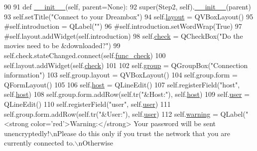 \begin{DoxyCode}
90 
91     \textcolor{keyword}{def }\hyperlink{classmovies2hdd_1_1gui_1_1_step2_adbcd30dbde1136bd162a892ee16f6584}{\_\_init\_\_}(self, parent=None):
92         super(Step2, self).\hyperlink{classmovies2hdd_1_1gui_1_1_step2_adbcd30dbde1136bd162a892ee16f6584}{\_\_init\_\_}(parent)
93         self.setTitle(\textcolor{stringliteral}{"Connect to your Dreambox"})
94         self.\hyperlink{classmovies2hdd_1_1gui_1_1_step2_a0a18ea7d6f2a66251b60d74b8af0696b}{layout} = QVBoxLayout()
95         \textcolor{comment}{#self.introduction = QLabel("")}
96         \textcolor{comment}{#self.introduction.setWordWrap(True)}
97         \textcolor{comment}{#self.layout.addWidget(self.introduction)}
98         self.\hyperlink{classmovies2hdd_1_1gui_1_1_step2_af460b9a80cc6f30892480537debd47f9}{check} = QCheckBox(\textcolor{stringliteral}{"Do the movies need to be &downloaded?"})
99         self.check.stateChanged.connect(self.\hyperlink{classmovies2hdd_1_1gui_1_1_step2_a9edb6b6d3a228791366c2003c7b17edf}{func\_check})
100         self.layout.addWidget(self.\hyperlink{classmovies2hdd_1_1gui_1_1_step2_af460b9a80cc6f30892480537debd47f9}{check})
101 
102         self.\hyperlink{classmovies2hdd_1_1gui_1_1_step2_ac4656ee08d1176420516f83a856b0799}{group} = QGroupBox(\textcolor{stringliteral}{"Connection information"})
103         self.group.layout = QVBoxLayout()
104         self.group.form = QFormLayout()
105 
106         self.\hyperlink{classmovies2hdd_1_1gui_1_1_step2_a683a7687252c2018725e11630076d804}{host} = QLineEdit()
107         self.registerField(\textcolor{stringliteral}{"host"}, self.\hyperlink{classmovies2hdd_1_1gui_1_1_step2_a683a7687252c2018725e11630076d804}{host})
108         self.group.form.addRow(self.tr(\textcolor{stringliteral}{"&Host:"}), self.\hyperlink{classmovies2hdd_1_1gui_1_1_step2_a683a7687252c2018725e11630076d804}{host})
109         self.\hyperlink{classmovies2hdd_1_1gui_1_1_step2_a18455a364c4876707a596f250568abce}{user} = QLineEdit()
110         self.registerField(\textcolor{stringliteral}{"user"}, self.\hyperlink{classmovies2hdd_1_1gui_1_1_step2_a18455a364c4876707a596f250568abce}{user})
111         self.group.form.addRow(self.tr(\textcolor{stringliteral}{"&User:"}), self.\hyperlink{classmovies2hdd_1_1gui_1_1_step2_a18455a364c4876707a596f250568abce}{user})
112         self.\hyperlink{classmovies2hdd_1_1gui_1_1_step2_a87c68120beaf76279360a47159d5c7aa}{warning} = QLabel(\textcolor{stringliteral}{"<strong color='red'>Warning:</strong> Your password will be sent
       unencryptedly!\(\backslash\)nPlease do this only if you trust the network that you are currently connected to.\(\backslash\)nOtherwise
}
\end{DoxyCode}
